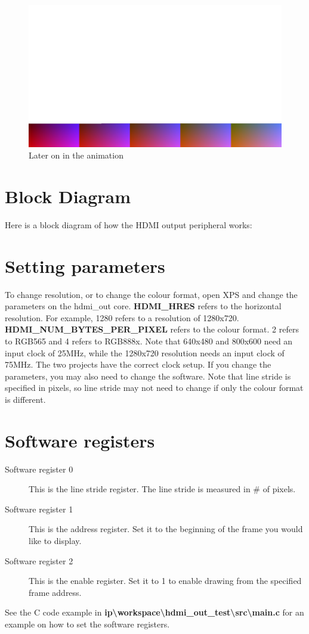 \documentclass[12pt]{article}
\begin{document}
\begin{enumerate}
\begin{figure}[h!]
      \end{figure}
      \newpage
      \begin{figure}[h!]
        \centering
        \includegraphics[width=6in]{ref2.jpg}
        \caption{Later on in the animation}
      \end{figure}
  \end{enumerate}
  \section{Block Diagram}
  Here is a block diagram of how the HDMI output peripheral works:
  \section{Setting parameters}
  To change resolution, or to change the colour format, open XPS and change the parameters on the hdmi\_out core. \textbf {HDMI\_HRES} refers to the horizontal resolution. For example, 1280 refers to a resolution of 1280x720. \textbf {HDMI\_NUM\_BYTES\_PER\_PIXEL} refers to the colour format. 2 refers to RGB565 and 4 refers to RGB888x. Note that 640x480 and 800x600 need an input clock of 25MHz, while the 1280x720 resolution needs an input clock of 75MHz. The two projects have the correct clock setup. If you change the parameters, you may also need to change the software. Note that line stride is specified in pixels, so line stride may not need to change if only the colour format is different.
  \section{Software registers}
  \begin{description}
    \item[Software register 0] This is the line stride register. The line stride is measured in \# of pixels.
    \item[Software register 1] This is the address register. Set it to the beginning of the frame you would like to display.
    \item[Software register 2] This is the enable register. Set it to 1 to enable drawing from the specified frame address.
  \end{description}
  See the C code example in \textbf {ip\textbackslash{}workspace\textbackslash{}hdmi\_out\_test\textbackslash{}src\textbackslash{}main.c} for an example on how to set the software registers.
\end{document}
